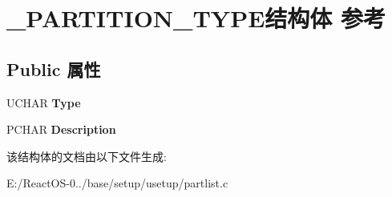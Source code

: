 \hypertarget{struct___p_a_r_t_i_t_i_o_n___t_y_p_e}{}\section{\+\_\+\+P\+A\+R\+T\+I\+T\+I\+O\+N\+\_\+\+T\+Y\+P\+E结构体 参考}
\label{struct___p_a_r_t_i_t_i_o_n___t_y_p_e}
\subsection*{Public 属性}
\begin{DoxyCompactItemize}
\item 
\mbox{\label{struct___p_a_r_t_i_t_i_o_n___t_y_p_e_a6b2aee9ca2e33ccee2fa5f6921adc23e}} 
U\+C\+H\+AR {\bfseries Type}
\item 
\mbox{\label{struct___p_a_r_t_i_t_i_o_n___t_y_p_e_a79b0e5bc0a01ec96a2353c2a8c4c7199}} 
P\+C\+H\+AR {\bfseries Description}
\end{DoxyCompactItemize}


该结构体的文档由以下文件生成\+:\begin{DoxyCompactItemize}
\item 
E\+:/\+React\+O\+S-\/0../base/setup/usetup/partlist.\+c\end{DoxyCompactItemize}
